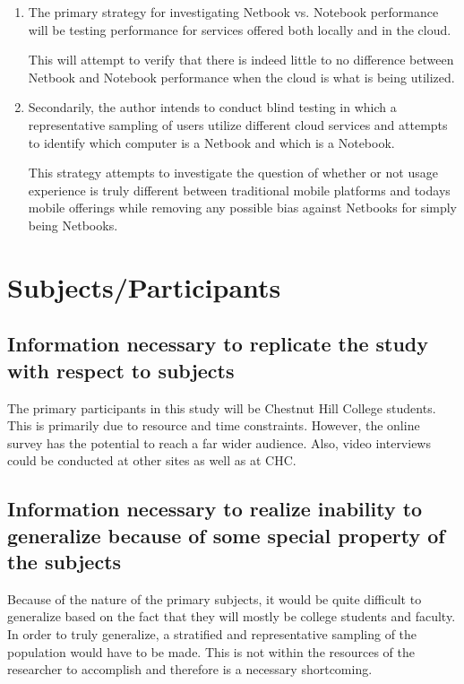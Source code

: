\documentclass[12pt,oneside,letterpaper,titlepage]{article}
\begin{document}
\begin{enumerate}

\item The primary strategy for investigating Netbook vs. Notebook performance
  will be testing performance for services offered both locally and in the
  cloud.

  This will attempt to verify that there is indeed little to no difference
  between Netbook and Notebook performance when the cloud is what is being
  utilized.

\item Secondarily, the author intends to conduct blind testing in which a
  representative sampling of users utilize different cloud services and attempts
  to identify which computer is a Netbook and which is a Notebook.

  This strategy attempts to investigate the question of whether or not usage
  experience is truly different between traditional mobile platforms and todays
  mobile offerings while removing any possible bias against Netbooks for simply
  being Netbooks.

\end{enumerate}

\section{Subjects/Participants}

\subsection{Information necessary to replicate the study with respect to subjects}

The primary participants in this study will be Chestnut Hill College students.
This is primarily due to resource and time constraints.  However, the online
survey has the potential to reach a far wider audience.  Also, video interviews
could be conducted at other sites as well as at CHC.

\subsection{Information necessary to realize inability to generalize because of some special property of the subjects}

Because of the nature of the primary subjects, it would be quite difficult to
generalize based on the fact that they will mostly be college students and
faculty.  In order to truly generalize, a stratified and representative sampling
of the population would have to be made.  This is not within the resources of
the researcher to accomplish and therefore is a necessary shortcoming.
\end{document}
